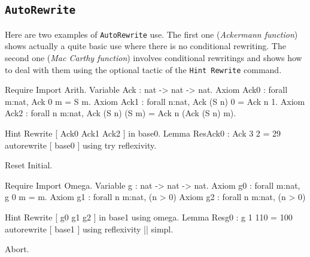 \begin{coq_example*}
\section{\tt AutoRewrite}
\label{AutoRewrite-example}

Here are two examples of {\tt AutoRewrite} use. The first one ({\em Ackermann
function}) shows actually a quite basic use where there is no conditional
rewriting. The second one ({\em Mac Carthy function}) involves conditional
rewritings and shows how to deal with them using the optional tactic of the
{\tt Hint~Rewrite} command.

\firstexample
{}

\begin{coq_example*}
Require Import Arith.
Variable Ack : 
           nat -> nat -> nat.
Axiom Ack0 : 
        forall m:nat, Ack 0 m = S m.
Axiom Ack1 : forall n:nat, Ack (S n) 0 = Ack n 1.
Axiom Ack2 : forall n m:nat, Ack (S n) (S m) = Ack n (Ack (S n) m).
\end{coq_example*}

\begin{coq_example}
Hint Rewrite [ Ack0 Ack1 Ack2 ] in base0.
Lemma ResAck0 : 
 Ack 3 2 = 29%
autorewrite [ base0 ] using try reflexivity.
\end{coq_example}

\begin{coq_eval}
Reset Initial.
\end{coq_eval}


\begin{coq_example*}
Require Import Omega.
Variable g :   
           nat -> nat -> nat.
Axiom g0 : 
        forall m:nat, g 0 m = m.
Axiom
  g1 :
    forall n m:nat,
      (n > 0)%
Axiom
  g2 :
    forall n m:nat,
      (n > 0)%
\end{coq_example*}

\begin{coq_example}
Hint Rewrite [ g0 g1 g2 ] in base1 using omega.
Lemma Resg0 : 
 g 1 110 = 100%
autorewrite [ base1 ] using reflexivity || simpl.
\end{coq_example}

\begin{coq_eval}
Abort.
\end{coq_eval}


\end{coq_example*}
